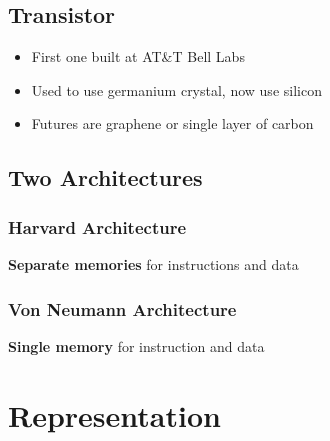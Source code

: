 \documentclass[11pt]{article}
\begin{document}
\subsection{Transistor}
\label{sec:org0d3bf0d}

\begin{itemize}
\item First one built at AT\&T Bell Labs
\item Used to use germanium crystal, now use silicon
\item Futures are graphene or single layer of carbon
\end{itemize}

\subsection{Two Architectures}
\label{sec:org346516e}

\subsubsection{Harvard Architecture}
\label{sec:orgeebcadf}

\textbf{Separate memories} for instructions and data

\subsubsection{Von Neumann Architecture}
\label{sec:orgbc69deb}

\textbf{Single memory} for instruction and data

\section{Representation}
\label{sec:org2be4f8e}
\end{document}
